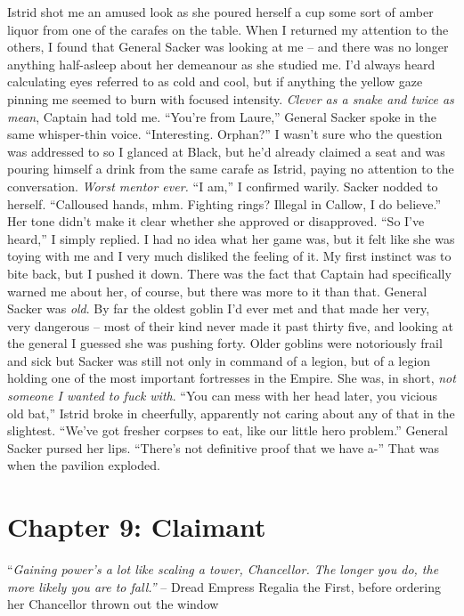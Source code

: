 \documentclass[12pt, openany]{book}
\begin{document}
Istrid shot me an amused look as she poured herself a cup some sort of amber liquor from one of the carafes on the table. When I returned my attention to the others, I found that General Sacker was looking at me – and there was no longer anything half-asleep about her demeanour as she studied me. I’d always heard calculating eyes referred to as cold and cool, but if anything the yellow gaze pinning me seemed to burn with focused intensity. \textit{Clever as a snake and twice as mean}, Captain had told me.
“You’re from Laure,” General Sacker spoke in the same whisper-thin voice. “Interesting. Orphan?”
I wasn’t sure who the question was addressed to so I glanced at Black, but he’d already claimed a seat and was pouring himself a drink from the same carafe as Istrid, paying no attention to the conversation. \textit{Worst mentor ever.}
“I am,” I confirmed warily.
Sacker nodded to herself. “Calloused hands, mhm. Fighting rings? Illegal in Callow, I do believe.”
Her tone didn’t make it clear whether she approved or disapproved.
“So I’ve heard,” I simply replied.
I had no idea what her game was, but it felt like she was toying with me and I very much disliked the feeling of it. My first instinct was to bite back, but I pushed it down. There was the fact that Captain had specifically warned me about her, of course, but there was more to it than that. General Sacker was \textit{old}. By far the oldest goblin I’d ever met and that made her very, very dangerous – most of their kind never made it past thirty five, and looking at the general I guessed she was pushing forty. Older goblins were notoriously frail and sick but Sacker was still not only in command of a legion, but of a legion holding one of the most important fortresses in the Empire. She was, in short, \textit{not someone I wanted to fuck with}.
“You can mess with her head later, you vicious old bat,” Istrid broke in cheerfully, apparently not caring about any of that in the slightest. “We’ve got fresher corpses to eat, like our little hero problem.”
General Sacker pursed her lips.
“There’s not definitive proof that we have a-”
That was when the pavilion exploded.
\clearpage
\chapter{Chapter 9: Claimant}

“\textit{Gaining power’s a lot like scaling a tower, Chancellor. The longer you do, the more likely you are to fall.”}
– Dread Empress Regalia the First, before ordering her Chancellor thrown out the window
\end{document}
